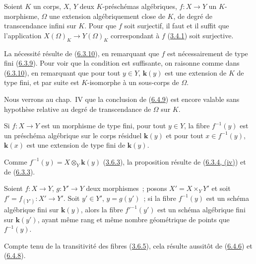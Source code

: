 \begin{proposition}[6.4.9]
\label{I.6.4.9-fr}
Soient $K$ un corps, $X$, $Y$ deux $K$-préschémas algébriques, $f:X\to Y$ un
$K$-morphisme, $\Omega$ une extension algébriquement close de $K$, de degré
de transcendance infini sur $K$. Pour que $f$ soit surjectif, il faut et il
suffit que l'application $X(\Omega)_K\to Y(\Omega)_K$ correspondant à $f$
\textup{(\hyperref[I.3.4.1-fr]{3.4.1})} soit surjective.
\end{proposition}

La nécessité résulte de (\hyperref[I.6.3.10-fr]{6.3.10}), en remarquant que
$f$ est nécessairement de type fini (\hyperref[I.6.3.9-fr]{6.3.9}). Pour voir
que la condition est suffisante, on raisonne comme dans
(\hyperref[I.6.3.10-fr]{6.3.10}), en remarquant que pour tout $y\in Y$,
$\boldsymbol{k}(y)$ est une extension de $K$ de type fini, et par suite est $K$-isomorphe
à un sous-corps de $\Omega$.

\begin{remark}[6.4.10]
\label{I.6.4.10-fr}
Nous verrons au chap.~IV que la conclusion de
(\hyperref[I.6.4.9-fr]{6.4.9}) est encore valable sans hypothèse relative au
degré de transcendance de $\Omega$ sur $K$.
\end{remark}

\begin{proposition}[6.4.11]
\label{I.6.4.11-fr}
Si $f:X\to Y$ est un morphisme de type fini, pour tout $y\in Y$, la fibre
$f^{-1}(y)$ est un préschéma algébrique sur le corps résiduel $\boldsymbol{k}(y)$ et pour
tout $x\in f^{-1}(y)$, $\boldsymbol{k}(x)$ est une extension de type fini de $\boldsymbol{k}(y)$.
\end{proposition}

Comme $f^{-1}(y)=X\otimes_Y \boldsymbol{k}(y)$
(\hyperref[I.3.6.3-fr]{3.6.3}), la proposition résulte de
(\hyperref[I.6.3.4-fr]{6.3.4, (iv)}) et de
(\hyperref[I.6.3.3-fr]{6.3.3}).

\begin{proposition}[6.4.12]
\label{I.6.4.12-fr}
Soient $f:X\to Y$, $g:Y'\to Y$ deux morphismes~; posons
$X'=X\times_Y Y'$ et soit $f'=f_{(Y')}:X'\to Y'$. Soit $y'\in Y'$,
$y=g(y')$~; si la fibre $f^{-1}(y)$ est un schéma algébrique fini sur $\boldsymbol{k}(y)$,
alors la fibre $f'^{-1}(y')$ est un schéma algébrique fini sur $\boldsymbol{k}(y')$, ayant
même rang et même nombre géométrique de points que $f^{-1}(y)$.
\end{proposition}

Compte tenu de la transitivité des fibres
(\hyperref[I.3.6.5-fr]{3.6.5}), cela résulte aussitôt de
(\hyperref[I.6.4.6-fr]{6.4.6}) et
(\hyperref[I.6.4.8-fr]{6.4.8}).

